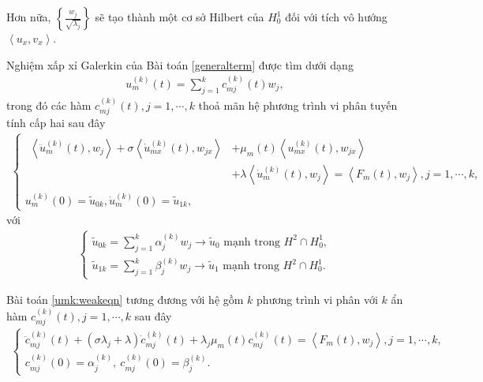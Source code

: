 \documentclass[12pt,a4paper]{article}
\theoremstyle{definition}
\theoremstyle{definition}
\begin{document}
Hơn nữa, $\left\{ \frac{w_j}{\sqrt{\lambda_j}} \right\}$ sẽ tạo thành một cơ sở Hilbert của $H^1_0$ đối với tích vô hướng $\left< u_x, v_x \right>$.

Nghiệm xấp xỉ Galerkin của Bài toán \eqref{generalterm} được tìm dưới dạng
\begin{align}
    u_m^{(k)}(t) = \sum_{j=1}^k c_{mj}^{(k)}(t) w_j,
\end{align}
trong đó các hàm $c_{mj}^{(k)}(t), j = 1,\cdots,k$ thoả mãn hệ phương trình vi phân tuyến tính cấp hai sau đây
\begin{align} \label{umk:weakeqn}
\begin{cases}
    \begin{aligned}
    \left< \ddot{u}_m^{(k)}(t), w_j \right>
    + \sigma \left<\dot{u}_{mx}^{(k)}(t), w_{jx}\right>
    &+ \mu_m(t) \left< u_{mx}^{(k)}(t), w_{jx}\right> \\
    &+ \lambda \left< \dot{u}_m^{(k)}(t), w_j \right> 
    = \left<F_m(t), w_j \right>, j = 1,\cdots,k,
    \end{aligned} \\
    u_m^{(k)}(0) = \tilde{u}_{0k}, \dot{u}_m^{(k)}(0) = \tilde{u}_{1k},
\end{cases}
\end{align}
với
\begin{align} \label{310}
\begin{cases}
    \tilde{u}_{0k} = \displaystyle \sum_{j=1}^k \alpha_j^{(k)} w_j \to \tilde{u}_0 \text{ mạnh trong } H^2 \cap H^1_0, \\
    \tilde{u}_{1k} = \displaystyle \sum_{j=1}^k \beta_j^{(k)} w_j \to \tilde{u}_1 \text{ mạnh trong } H^2 \cap H^1_0.
\end{cases}
\end{align}

Bài toán \eqref{umk:weakeqn} tương đương với hệ gồm $k$ phương trình vi phân với $k$ ẩn hàm $c_{mj}^{(k)}(t), j = 1,\cdots,k$ sau đây
\begin{align} \label{cmk:eqn}
\begin{cases}
    \ddot{c}_{mj}^{(k)}(t)
    + (\sigma \lambda_j + \lambda) \dot{c}_{mj}^{(k)}(t)
    + \lambda_j \mu_m(t) c_{mj}^{(k)}(t) = \left<F_m(t), w_j\right>, j=1,\cdots,k, \\[0.2cm]
    c_{mj}^{(k)}(0) = \alpha_j^{(k)},\  c_{mj}^{(k)}(0) = \beta_j^{(k)}.
\end{cases}
\end{align}
\end{document}
